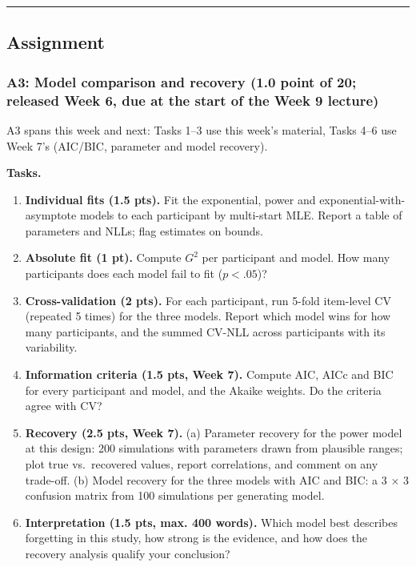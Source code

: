 \begin{center}\rule{0.5\linewidth}{0.5pt}\end{center}


\subsection{Assignment}

\subsubsection{A3: Model comparison and recovery (1.0 point of 20;
released Week 6, due at the start of the Week 9 lecture)}

A3 spans this week and next: Tasks 1--3 use this week's material, Tasks
4--6 use Week 7's (AIC/BIC, parameter and model recovery).

\textbf{Tasks.}

\begin{enumerate}
\def\labelenumi{\arabic{enumi}.}
\tightlist
\item
  \textbf{Individual fits (1.5 pts).} Fit the exponential, power and
  exponential-with-asymptote models to each participant by multi-start
  MLE. Report a table of parameters and NLLs; flag estimates on bounds.
\item
  \textbf{Absolute fit (1 pt).} Compute \(G^2\) per participant and
  model. How many participants does each model fail to fit
  (\(p < .05\))?
\item
  \textbf{Cross-validation (2 pts).} For each participant, run 5-fold
  item-level CV (repeated 5 times) for the three models. Report which
  model wins for how many participants, and the summed CV-NLL across
  participants with its variability.
\item
  \textbf{Information criteria (1.5 pts, Week 7).} Compute AIC, AICc and
  BIC for every participant and model, and the Akaike weights. Do the
  criteria agree with CV?
\item
  \textbf{Recovery (2.5 pts, Week 7).} (a) Parameter recovery for the
  power model at this design: 200 simulations with parameters drawn from
  plausible ranges; plot true vs.~recovered values, report correlations,
  and comment on any trade-off. (b) Model recovery for the three models
  with AIC and BIC: a 3 × 3 confusion matrix from 100 simulations per
  generating model.
\item
  \textbf{Interpretation (1.5 pts, max. 400 words).} Which model best
  describes forgetting in this study, how strong is the evidence, and
  how does the recovery analysis qualify your conclusion?
\end{enumerate}

